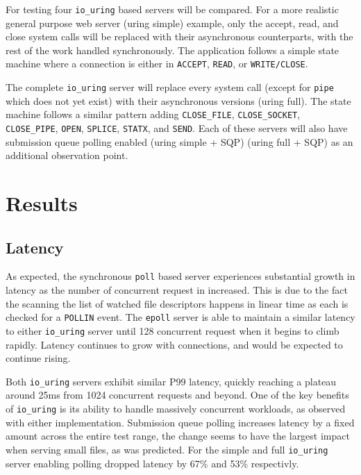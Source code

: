 \documentclass[letterpaper, 10pt, twocolumn]{article}
\begin{document}
For testing four \texttt{io\_uring} based servers will be compared. For a more realistic general purpose web server (uring simple) example, only the accept, read, and close system calls will be replaced with their asynchronous counterparts, with the rest of the work handled synchronously. The application follows a simple state machine where a connection is either in \texttt{ACCEPT}, \texttt{READ}, or \texttt{WRITE/CLOSE}.

The complete \texttt{io\_uring} server will replace every system call (except for \texttt{pipe} which does not yet exist) with their asynchronous versions (uring full). The state machine follows a similar pattern adding \texttt{CLOSE\_FILE}, \texttt{CLOSE\_SOCKET}, \texttt{CLOSE\_PIPE}, \texttt{OPEN}, \texttt{SPLICE}, \texttt{STATX}, and \texttt{SEND}. Each of these servers will also have submission queue polling enabled (uring simple + SQP) (uring full + SQP) as an additional observation point. 
\section{Results}
\label{sec:orgb128081}
\subsection{Latency}
\label{sec:orga8814a0}
As expected, the synchronous \texttt{poll} based server experiences substantial growth in latency as the number of concurrent request in increased. This is due to the fact the scanning the list of watched file descriptors happens in linear time as each is checked for a \texttt{POLLIN} event. The \texttt{epoll} server is able to maintain a similar latency to either \texttt{io\_uring} server until 128 concurrent request when it begins to climb rapidly. Latency continues to grow with connections, and would be expected to continue rising.

Both \texttt{io\_uring} servers exhibit similar P99 latency, quickly reaching a plateau around 25ms from 1024 concurrent requests and beyond. One of the key benefits of \texttt{io\_uring} is its ability to handle massively concurrent workloads, as observed with either implementation. Submission queue polling increases latency by a fixed amount across the entire test range, the change seems to have the largest impact when serving small files, as was predicted. For the simple and full \texttt{io\_uring} server enabling polling dropped latency by 67\% and 53\% respectivly.
\end{document}
